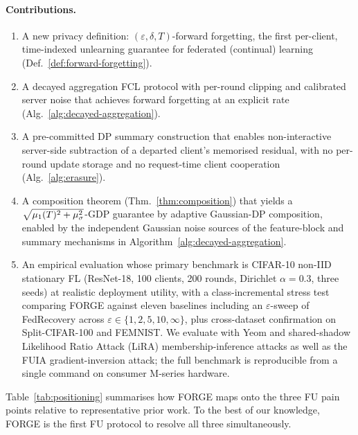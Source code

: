 \paragraph{Contributions.}
\begin{enumerate}[leftmargin=*,itemsep=2pt]
\item A new privacy definition: $(\varepsilon, \delta, T)$-forward forgetting, the first
per-client, time-indexed unlearning guarantee for federated (continual) learning
(Def.~\ref{def:forward-forgetting}).
\item A decayed aggregation FCL protocol with per-round clipping and calibrated server
noise that achieves forward forgetting at an explicit rate
(Alg.~\ref{alg:decayed-aggregation}).
\item A pre-committed DP summary construction that enables non-interactive server-side
subtraction of a departed client's memorised residual, with no per-round update storage
and no request-time client cooperation (Alg.~\ref{alg:erasure}).
\item A composition theorem (Thm.~\ref{thm:composition}) that yields a
$\sqrt{\mu_1(T)^2 + \mu_\sigma^2}$-GDP guarantee by adaptive Gaussian-DP
composition, enabled by the independent Gaussian noise sources of the feature-block
and summary mechanisms in Algorithm~\ref{alg:decayed-aggregation}.
\item An empirical evaluation whose primary benchmark is CIFAR-10 non-IID
stationary FL (ResNet-18, 100 clients, 200 rounds, Dirichlet $\alpha{=}0.3$, three
seeds) at realistic deployment utility, with a class-incremental stress test
comparing FORGE against eleven baselines including an $\varepsilon$-sweep of
FedRecovery across $\varepsilon \in \{1, 2, 5, 10, \infty\}$, plus cross-dataset
confirmation on Split-CIFAR-100 and FEMNIST. We evaluate with Yeom and
shared-shadow Likelihood Ratio Attack (LiRA) membership-inference attacks as well
as the FUIA gradient-inversion attack; the full benchmark is reproducible from a
single command on consumer M-series hardware.
\end{enumerate}

Table~\ref{tab:positioning} summarises how FORGE maps onto the three FU pain points
relative to representative prior work. To the best of our knowledge, FORGE is the first
FU protocol to resolve all three simultaneously.


